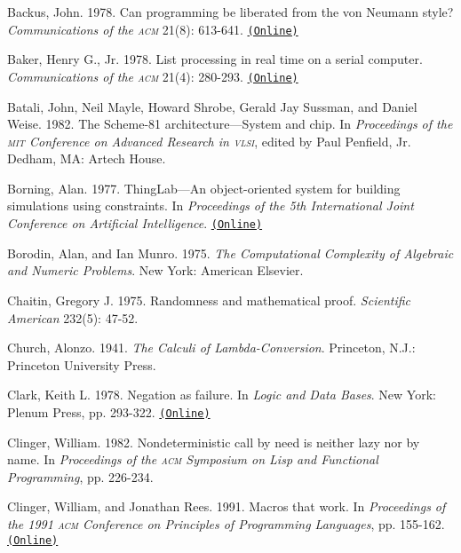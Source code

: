 \documentclass[oneside]{book}
\newcommand{\acronym}[1]{\textsc{\MakeLowercase{#1}}}
\newcommand{\code}[1]{\texttt{#1}}
\begin{document}
 \label{Backus 1978}
Backus, John.  1978.  Can programming be liberated from the von Neumann style?
\textit{Communications of the \acronym{ACM}} 21(8): 613-641.
\href{http://www.stanford.edu/class/cs242/readings/backus.pdf}{\code{(Online)}}

 \label{Baker (1978)}
Baker, Henry G., Jr.  1978.  List processing in real time on a serial computer.
\textit{Communications of the \acronym{ACM}} 21(4): 280-293.
\href{http://dspace.mit.edu/handle/1721.1/41976}{\code{(Online)}}

 \label{Batali et al. 1982}
Batali, John, Neil Mayle, Howard Shrobe, Gerald Jay Sussman, and Daniel Weise.
1982.  The Scheme-81 architecture---System and chip.  In \textit{Proceedings of
the \acronym{MIT} Conference on Advanced Research in \acronym{VLSI}}, edited by
Paul Penfield, Jr. Dedham, MA: Artech House.

 \label{Borning (1977)}
Borning, Alan.  1977.  ThingLab---An object-oriented system for building
simulations using constraints. In \textit{Proceedings of the 5th International
Joint Conference on Artificial Intelligence}.
\href{http://ijcai.org/Past\%20Proceedings/IJCAI-77-VOL1/PDF/085.pdf}{\code{(Online)}}

 \label{Borodin and Munro (1975)}
Borodin, Alan, and Ian Munro.  1975.  \textit{The Computational Complexity of
Algebraic and Numeric Problems}. New York: American Elsevier.

 \label{Chaitin 1975}
Chaitin, Gregory J.  1975.  Randomness and mathematical proof.
\textit{Scientific American} 232(5): 47-52.

 \label{Church (1941)}
Church, Alonzo.  1941.  \textit{The Calculi of Lambda-Conversion}.  Princeton,
N.J.: Princeton University Press.

 \label{Clark (1978)}
Clark, Keith L.  1978.  Negation as failure.  In \textit{Logic and Data Bases}.
New York: Plenum Press, pp. 293-322.
\href{http://www.doc.ic.ac.uk/~klc/neg.html}{\code{(Online)}}

 \label{Clinger (1982)}
Clinger, William.  1982.  Nondeterministic call by need is neither lazy nor by
name. In \textit{Proceedings of the \acronym{ACM} Symposium on Lisp and
Functional Programming}, pp. 226-234.

 \label{Clinger and Rees 1991}
Clinger, William, and Jonathan Rees.  1991.  Macros that work.  In
\textit{Proceedings of the 1991 \acronym{ACM} Conference on Principles of
Programming Languages}, pp. 155-162.
\href{http://mumble.net/~jar/pubs/macros_that_work.ps}{\code{(Online)}}
\end{document}
